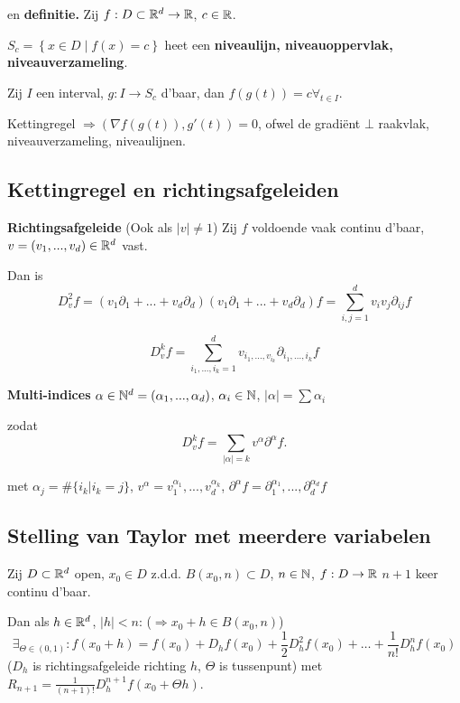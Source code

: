 \documentclass{2wa40summary}
\begin{document}
			\gevolg en \textbf{definitie.} Zij $f:D \subset \mathbb{R}^d \to \mathbb{R}$, $c \in \mathbb{R}$. 
			
			$S_c = \left\{ x\in D \middle| f(x)=c \right\}$ heet een \textbf{niveaulijn, niveauoppervlak, niveauverzameling}.
			
			Zij $I$ een interval, $g: I\to S_c$ d'baar, dan $f(g(t))=c \forall_{t \in I}$.
			
			\opm Kettingregel $\Rightarrow (\nabla f(g(t)),g'(t)) = 0$, ofwel de gradi\"ent $\bot$ raakvlak, niveauverzameling, niveaulijnen.
			
		\subsection{Kettingregel en richtingsafgeleiden}
			
			 \textbf{Richtingsafgeleide} (Ook als $|v|\neq 1$)
			Zij $f$ voldoende vaak continu d'baar, $v=(v_1,...,v_d) \in \mathbb{R}^d$ vast.
			
			Dan is \[ D_v^2 f = (v_1 \partial_1 + ... + v_d \partial_d)(v_1 \partial_1 + ... + v_d \partial_d)f = \sum_{i,j=1}^{d} v_i v_j \partial_{ij}f \]
			
			\[ D_v^k f = \sum_{i_1,...,i_k=1}^{d} v_{{i_1},...,v_{i_k}} \partial_{i_1,...,i_k} f \]
			
			\nota \textbf{Multi-indices} $ \alpha \in \mathbb{N}^d = (\alpha_1 ,..., \alpha_d) $, $\alpha_i \in \mathbb{N}$, $ |\alpha| = \sum \alpha_i $
			
			zodat \[ D_v^k f = \sum_{|\alpha|=k} v^\alpha \partial^\alpha f. \]
			
			met $ \alpha_j = \#\{i_k | i_k = j\} $, $ v^\alpha = v_1^{\alpha_1} ,..., v_d^{\alpha_k} $, $ \partial^\alpha f = \partial_1^{\alpha_1},...,\partial_d^{\alpha_d} f $
			
		\subsection{Stelling van Taylor met meerdere variabelen}
			\theorem Zij  $D \subset \mathbb{R}^d$ open, $x_0 \in D$ z.d.d. $B(x_0,n) \subset D$, $n\in \mathbb{N}$, $f:D\to \mathbb{R}$ $n+1$ keer continu d'baar.
			
			Dan als $h \in \mathbb{R}^d$, $ |h|<n $: ($\Rightarrow x_0+h \in B(x_0,n)$)
			\[ \exists_{\Theta \in (0,1)}:f(x_0+h) = f(x_0) + D_h f(x_0) + \frac{1}{2} D_h^2 f(x_0) + \dots + \frac{1}{n!} D_h^n f(x_0) \]
			($D_h$ is richtingsafgeleide richting $h$, $\Theta$ is tussenpunt)
			met $R_{n+1} = \frac{1}{(n+1)!}D_h^{n+1} f(x_0 + \Theta h)$.
		
\end{document}
